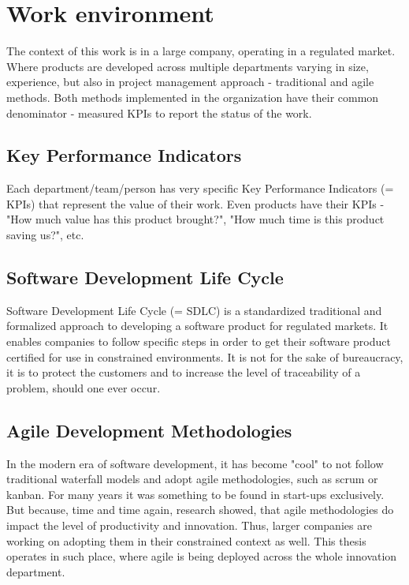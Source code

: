 \newpage

\section{Work environment}

The context of this work is in a large company, operating in a regulated market. Where products are developed across multiple departments varying in size, experience, but also in project management approach - traditional and agile methods. Both methods implemented in the organization have their common denominator - measured KPIs to report the status of the work.

\subsection{Key Performance Indicators}

Each department/team/person has very specific Key Performance Indicators (= KPIs) that represent the value of their work. Even products have their KPIs - "How much value has this product brought?", "How much time is this product saving us?", etc.

\subsection{Software Development Life Cycle}

Software Development Life Cycle (= SDLC) is a standardized traditional and formalized approach to developing a software product for regulated markets. It enables companies to follow specific steps in order to get their software product certified for use in constrained environments. It is not for the sake of bureaucracy, it is to protect the customers and to increase the level of traceability of a problem, should one ever occur.

\subsection{Agile Development Methodologies}

In the modern era of software development, it has become "cool" to not follow traditional waterfall models and adopt agile methodologies, such as scrum or kanban. For many years it was something to be found in start-ups exclusively. But because, time and time again, research \cite{947100} showed, that agile methodologies do impact the level of productivity and innovation. Thus, larger companies are working on adopting them in their constrained context as well. This thesis operates in such place, where agile is being deployed across the whole innovation department.

